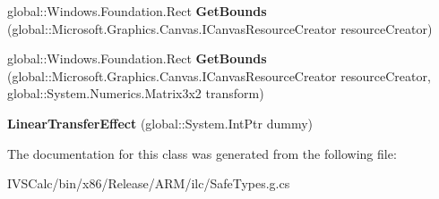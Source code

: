 \begin{DoxyCompactItemize}
global\+::\+Windows.\+Foundation.\+Rect {\bfseries Get\+Bounds} (global\+::\+Microsoft.\+Graphics.\+Canvas.\+I\+Canvas\+Resource\+Creator resource\+Creator)
\item 
\mbox{\label{class_microsoft_1_1_graphics_1_1_canvas_1_1_effects_1_1_linear_transfer_effect_a18b1ccc429d27cfdd87cfdc6d79203ee}} 
global\+::\+Windows.\+Foundation.\+Rect {\bfseries Get\+Bounds} (global\+::\+Microsoft.\+Graphics.\+Canvas.\+I\+Canvas\+Resource\+Creator resource\+Creator, global\+::\+System.\+Numerics.\+Matrix3x2 transform)
\item 
\mbox{\label{class_microsoft_1_1_graphics_1_1_canvas_1_1_effects_1_1_linear_transfer_effect_ab618808a7f44e9188b529ade14052be5}} 
{\bfseries Linear\+Transfer\+Effect} (global\+::\+System.\+Int\+Ptr dummy)
\end{DoxyCompactItemize}


The documentation for this class was generated from the following file\+:\begin{DoxyCompactItemize}
\item 
I\+V\+S\+Calc/bin/x86/\+Release/\+A\+R\+M/ilc/Safe\+Types.\+g.\+cs\end{DoxyCompactItemize}
